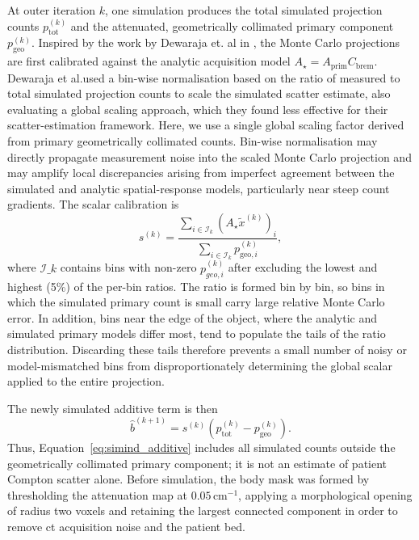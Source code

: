 At outer iteration $k$, one simulation produces the total simulated projection counts $p_{\mathrm{tot}}^{(k)}$ and the attenuated, geometrically collimated primary component $p_{\mathrm{geo}}^{(k)}$. Inspired by the work by Dewaraja et. al in \cite{dewarajaImprovedQuantitative90Y2017}, the Monte Carlo projections are first calibrated against the analytic acquisition model $A_{\star}=A_{\mathrm{prim}}C_{\mathrm{brem}}$. Dewaraja et al.used a bin-wise normalisation based on the ratio of measured to total simulated projection counts to scale the simulated scatter estimate, also evaluating a global scaling approach, which they found less effective for their scatter-estimation framework. Here, we use a single global scaling factor derived from primary geometrically collimated counts. Bin-wise normalisation may directly propagate measurement noise into the scaled Monte Carlo projection and may amplify local discrepancies arising from imperfect agreement between the simulated and analytic spatial-response models, particularly near steep count gradients. The scalar calibration is
\begin{equation}
    s^{(k)} =
    \frac{\sum_{i\in\mathcal I_k}(A_{\star}\widetilde x^{(k)})_i}
         {\sum_{i\in\mathcal I_k}p_{\mathrm{geo},i}^{(k)}},
    \label{eq:simind_scale}
\end{equation}
where $\mathcal I\_k$ contains bins with non-zero $p_{geo,i}^{(k)}$ after excluding the lowest and highest (5\%) of the per-bin ratios. The ratio is formed bin by bin, so bins in which the simulated primary count is small carry large relative Monte Carlo error. In addition, bins near the edge of the object, where the analytic and simulated primary models differ most, tend to populate the tails of the ratio distribution. Discarding these tails therefore prevents a small number of noisy or model-mismatched bins from disproportionately determining the global scalar applied to the entire projection.

The newly simulated additive term is then
\begin{equation}
    \widehat b^{(k+1)} =
    s^{(k)}\!\left(p_{\mathrm{tot}}^{(k)}-p_{\mathrm{geo}}^{(k)}\right).
    \label{eq:simind_additive}
\end{equation}
Thus, Equation~\ref{eq:simind_additive} includes all simulated counts outside the geometrically collimated primary component; it is not an estimate of patient Compton scatter alone. Before simulation, the body mask was formed by thresholding the attenuation map at $0.05\,\mathrm{cm}^{-1}$, applying a morphological opening of radius two voxels and retaining the largest connected component in order to remove \gls{ct} acquisition noise and the patient bed.

